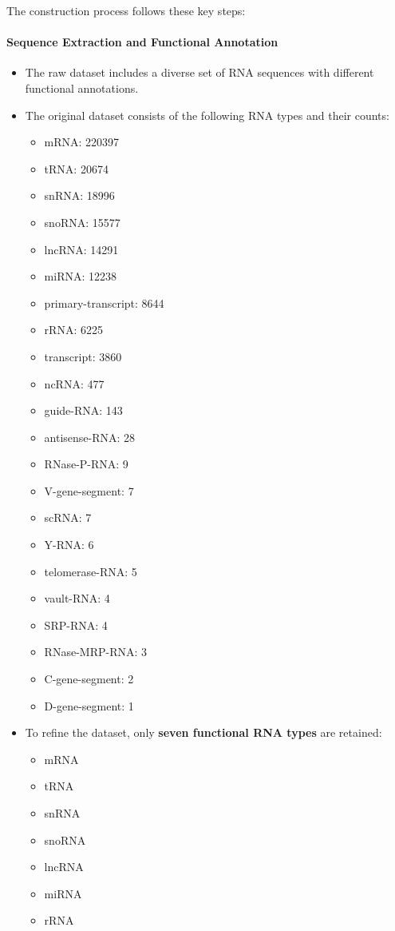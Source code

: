 The construction process follows these key steps:

\paragraph{Sequence Extraction and Functional Annotation}

\begin{itemize}
\item The raw dataset includes a diverse set of RNA sequences with different functional annotations.
\item The original dataset consists of the following RNA types and their counts:
\begin{itemize}
\item mRNA: 220397
\item tRNA: 20674
\item snRNA: 18996
\item snoRNA: 15577
\item lncRNA: 14291
\item miRNA: 12238
\item primary-transcript: 8644
\item rRNA: 6225
\item transcript: 3860
\item ncRNA: 477
\item guide-RNA: 143
\item antisense-RNA: 28
\item RNase-P-RNA: 9
\item V-gene-segment: 7
\item scRNA: 7
\item Y-RNA: 6
\item telomerase-RNA: 5
\item vault-RNA: 4
\item SRP-RNA: 4
\item RNase-MRP-RNA: 3
\item C-gene-segment: 2
\item D-gene-segment: 1
\end{itemize}
\item To refine the dataset, only \textbf{seven functional RNA types} are retained:
\begin{itemize}
\item mRNA
\item tRNA
\item snRNA
\item snoRNA
\item lncRNA
\item miRNA
\item rRNA
\end{itemize}
\end{itemize}


